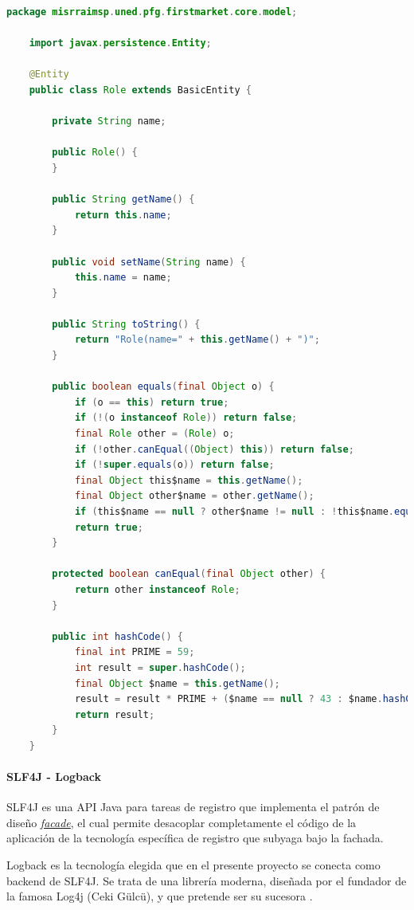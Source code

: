 \documentclass[a4paper,12pt,twoside,openright]{report}
\begin{document}
    \begin{lstlisting}[language=Java,caption=Clase \emph{Role} tras efectuar un \emph{Delombok},label=list:lombok_open]
    package misrraimsp.uned.pfg.firstmarket.core.model;
    
    import javax.persistence.Entity;
    
    @Entity
    public class Role extends BasicEntity {
    
	    private String name;
	    
	    public Role() {
	    }
	    
	    public String getName() {
	    	return this.name;
	    }
	    
	    public void setName(String name) {
	    	this.name = name;
	    }
	    
	    public String toString() {
	    	return "Role(name=" + this.getName() + ")";
	    }
	    
	    public boolean equals(final Object o) {
		    if (o == this) return true;
		    if (!(o instanceof Role)) return false;
		    final Role other = (Role) o;
		    if (!other.canEqual((Object) this)) return false;
		    if (!super.equals(o)) return false;
		    final Object this$name = this.getName();
		    final Object other$name = other.getName();
		    if (this$name == null ? other$name != null : !this$name.equals(other$name)) return false;
		    return true;
	    }
	    
	    protected boolean canEqual(final Object other) {
	    	return other instanceof Role;
	    }
	    
	    public int hashCode() {
		    final int PRIME = 59;
		    int result = super.hashCode();
		    final Object $name = this.getName();
		    result = result * PRIME + ($name == null ? 43 : $name.hashCode());
		    return result;
	    }
    }
    \end{lstlisting}
    
    \paragraph{SLF4J - Logback}
    SLF4J es una API Java para tareas de registro que implementa el patrón de diseño \href{https://en.wikipedia.org/wiki/Facade_pattern}{\emph{facade}}, el cual permite desacoplar completamente el código de la aplicación de la tecnología específica de registro que subyaga bajo la fachada.
    
    Logback es la tecnología elegida que en el presente proyecto se conecta como backend de SLF4J. Se trata de una librería moderna, diseñada por el fundador de la famosa Log4j (Ceki Gülcü), y que pretende ser su sucesora \cite{Thompson2016}.
    
\end{document}
